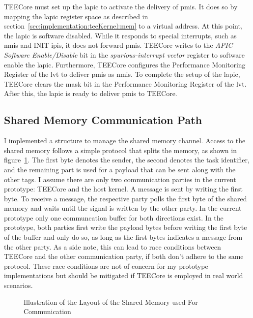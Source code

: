 TEECore must set up the \gls{lapic} to activate the delivery of \glspl{pmi}. It
does so by mapping the \gls{lapic} register space as described in
section~\ref{sec:implementation:teeKernel:mem} to a virtual address. At this
point, the \gls{lapic} is software disabled. While it responds to special
interrupts, such as \glspl{nmi} and INIT \glspl{ipi}, it does not forward
\glspl{pmi}. TEECore writes to the \textit{APIC Software Enable/Disable} bit in
the \textit{spurious-interrupt vector} register to software enable the
\gls{lapic}. Furthermore, TEECore configures the Performance Monitoring Register
of the \gls{lvt} to deliver \glspl{pmi} as \glspl{nmi}. To complete the setup of
the \gls{lapic}, TEECore clears the mask bit in the Performance Monitoring
Register of the \gls{lvt}. After this, the \gls{lapic} is ready to deliver
\glspl{pmi} to TEECore.

\subsection{Shared Memory Communication Path}
\label{sec:implementation:teeKernel:shared}
I implemented a structure to manage the shared memory channel. Access to the
shared memory follows a simple protocol that splits the memory, as shown in
figure~\ref{fig:impl:shared_mem_layout}. The first byte denotes the sender, the
second denotes the task identifier, and the remaining part is used for a payload
that can be sent along with the other tags. I assume there are only two
communication parties in the current prototype: TEECore and the
host kernel. A message is sent by writing the first byte. To receive a message,
the respective party polls the first byte of the shared memory and waits until
the signal is written by the other party. In the current prototype only one
communcation buffer for both directions exist. In the prototype, both parties
first write the payload bytes before writing the first byte of the buffer and
only do so, as long as the first bytes indicates a message from the other party.
As a side note, this can lead to race conditions between TEECore and the other
communication party, if both don't adhere to the same protocol. These race
conditions are not of concern for my prototype implementations but should be
mitigated if TEECore is employed in real world scenarios.\\

\begin{center}
  \begin{figure}[]
    \centering
    
    \caption{Illustration of the Layout of the Shared Memory used For Communication}
    \label{fig:impl:shared_mem_layout}
  \end{figure}
\end{center}

